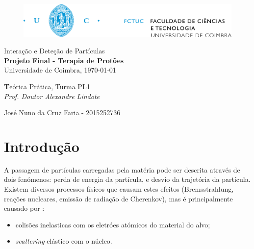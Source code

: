 \documentclass[a4paper, 12pt]{article} %
\def\classtitle{Interação e Deteção de Partículas}
\def\worktitle{Projeto Final - Terapia de Protões}
\def\profname{Doutor Alexandre Lindote}
\def\worklocal{Universidade de Coimbra}
\def\workdate{\today}
\def\authors{
	José Nuno da Cruz Faria - 2015252736
}
\def\classinfo{Teórica Prática, Turma PL1}
\begin{document}
	
	\begin{figure}[t] %
		\centering
		\includegraphics[width=0.85\linewidth]{uc_fctuc}
	\end{figure}

	\vspace*{0.05\textheight}	
	\begin{table}[!htbp]
		\centering
		
		{\Huge \classtitle}\\
		
		\vspace*{0.01\textheight}
		{\Large \textbf{\worktitle}}\\
		
		\vspace*{0.02\textheight}
		{\large {\worklocal, \workdate}}
		
	\end{table}
	
	\begin{table}[H]
		\begin{center}
			{\normalsize %
				\textbf\classinfo\\
				\emph{Prof. \profname}\\ 
				\vspace{0.0035\textheight}			
				\authors 
			}
		\end{center}
	\end{table}

	\section{Introdução}

	A passagem de partículas carregadas pela matéria pode ser descrita através de dois fenómenos: perda de energia da partícula, e desvio da trajetória da partícula.
	Existem diversos processos físicos que causam estes efeitos (Bremsstrahlung, reações nucleares, emissão de radiação de Cherenkov), mas é principalmente causado por \cite{Leo}:

	\begin{itemize}
		\item colisões inelasticas com os eletróes atómicos do material do alvo;
		\item \textit{scattering} elástico com o núcleo.
	\end{itemize}
    
\end{document}
